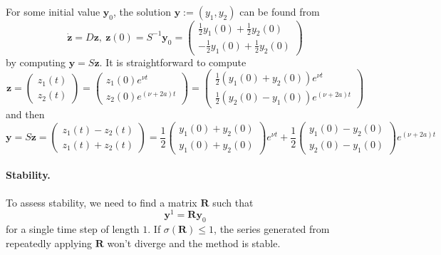 \documentclass{article}
\newcommand{\ve}[1]{\mathbf{#1}}
\begin{document}
For some initial value $\ve{y}_0$, the solution $\ve{y} := (y_1, y_2)$ can be found from
\begin{equation}
	\dot{\ve{z}} = D \ve{z}, \ \ve{z}(0) = S^{-1} \ve{y}_0 = \begin{pmatrix} \frac{1}{2} y_1(0) + \frac{1}{2} y_2(0) \\ -\frac{1}{2} y_1(0) + \frac{1}{2} y_2(0) \end{pmatrix}
\end{equation}
by computing $\ve{y} = S \ve{z}$.
It is straightforward to compute
\begin{equation}
	\ve{z} = \begin{pmatrix} z_1(t) \\ z_2(t) \end{pmatrix} = \begin{pmatrix} z_1(0) e^{\nu t} \\ z_2(0) e^{\left(\nu + 2a\right)t} \end{pmatrix} = \begin{pmatrix} \frac{1}{2} \left(y_1(0) + y_2(0) \right) e^{\nu t} \\ \frac{1}{2} \left( y_2(0) - y_1(0) \right) e^{(\nu + 2 a) t} \end{pmatrix}
\end{equation}
and then
\begin{equation}
	\ve{y} = S \ve{z} = \begin{pmatrix} z_{1}(t) - z_{2}(t) \\ z_{1}(t) + z_{2}(t) \end{pmatrix} = \frac{1}{2}  \begin{pmatrix}  y_1(0) + y_2(0)  \\ y_1(0) + y_2(0) \end{pmatrix} e^{\nu t} + \frac{1}{2} \begin{pmatrix} y_1(0) - y_2(0)   \\ y_2(0) - y_1(0) \end{pmatrix} e^{(\nu+2 a)t}
\end{equation}

\paragraph{Stability.}
To assess stability, we need to find a matrix $\ve{R}$ such that
\begin{equation}
	\ve{y}^1 = \ve{R} \ve{y}_0
\end{equation}
for a single time step of length $1$.
If $\sigma(\ve{R}) \leq 1$, the series generated from repeatedly applying $\ve{R}$ won't diverge and the method is stable.
\end{document}
